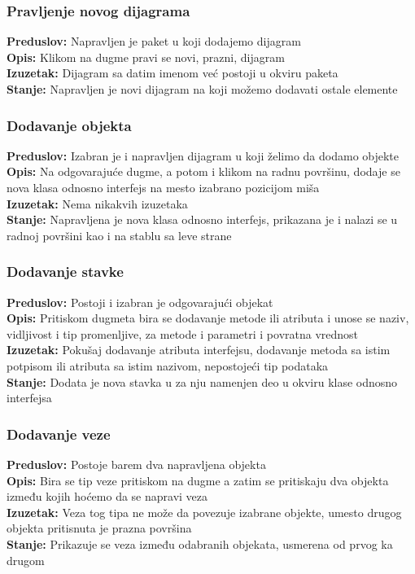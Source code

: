 \documentclass[a4paper]{article}
\begin{document}
\subsubsection{Pravljenje novog dijagrama}\noindent
\textbf{Preduslov:} Napravljen je paket u koji dodajemo dijagram
\\ \textbf{Opis:} Klikom na dugme pravi se novi, prazni, dijagram 
\\ \textbf{Izuzetak:} Dijagram sa datim imenom već postoji u okviru paketa
\\ \textbf{Stanje:} Napravljen je novi dijagram na koji možemo dodavati ostale elemente
\subsubsection{Dodavanje objekta}\noindent
\textbf{Preduslov:} Izabran je i napravljen dijagram u koji želimo da dodamo objekte 
\\ \textbf{Opis:} Na odgovarajuće dugme, a potom i klikom na radnu površinu, dodaje se nova klasa odnosno interfejs na mesto izabrano pozicijom miša
\\ \textbf{Izuzetak:} Nema nikakvih izuzetaka
\\ \textbf{Stanje:} Napravljena je nova klasa odnosno interfejs, prikazana je i nalazi se u radnoj površini kao i na stablu sa leve strane
\subsubsection{Dodavanje stavke}\noindent
\textbf{Preduslov:} Postoji i izabran je odgovarajući objekat 
\\ \textbf{Opis:} Pritiskom dugmeta bira se dodavanje metode ili atributa i unose se naziv, vidljivost i tip promenljive, za metode i parametri i povratna vrednost
\\ \textbf{Izuzetak:} Pokušaj dodavanje atributa interfejsu, dodavanje metoda sa istim potpisom ili atributa sa istim nazivom, nepostojeći tip podataka
\\ \textbf{Stanje:} Dodata je nova stavka u za nju namenjen deo u okviru klase odnosno interfejsa
\subsubsection{Dodavanje veze}\noindent
\textbf{Preduslov: }Postoje barem dva napravljena objekta \\
\textbf{Opis: }Bira se tip veze pritiskom na dugme a zatim se pritiskaju dva objekta između kojih hoćemo da se napravi veza\\
\textbf{Izuzetak: }Veza tog tipa ne može da povezuje izabrane objekte, umesto drugog objekta pritisnuta je prazna površina\\ 
\textbf{Stanje: }Prikazuje se veza između odabranih objekata, usmerena od prvog ka drugom 
\end{document}
